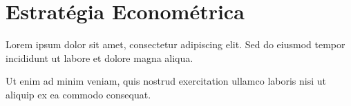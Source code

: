 \section{Estratégia Econométrica}

Lorem ipsum dolor sit amet, consectetur adipiscing elit. Sed do eiusmod tempor incididunt ut labore et dolore magna aliqua.

Ut enim ad minim veniam, quis nostrud exercitation ullamco laboris nisi ut aliquip ex ea commodo consequat.
